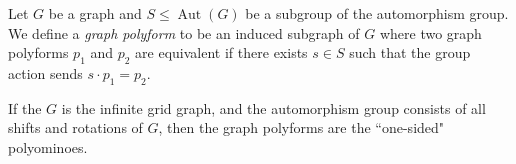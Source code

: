 \documentclass{article}
\begin{document}

Let $G$ be a graph and $S \leq \operatorname{Aut}(G)$ be a subgroup of the automorphism group. We define a \emph{graph polyform} to be an induced subgraph of $G$ where two graph polyforms $p_1$ and $p_2$ are equivalent if there exists $s \in S$ such that the group action sends $s \cdot p_1 = p_2$.

If the $G$ is the infinite grid graph, and the automorphism group consists of all shifts and rotations of $G$, then the graph polyforms are the ``one-sided" polyominoes.

\begin{figure}[ht!]
\end{figure}
\end{document}
